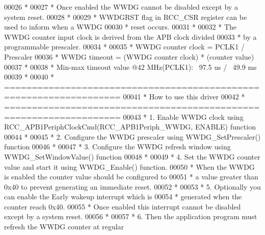 \begin{DoxyCode}
00026 \textcolor{comment}{  *            }
00027 \textcolor{comment}{  *          Once enabled the WWDG cannot be disabled except by a system reset.                       
         }
00028 \textcolor{comment}{  *          }
00029 \textcolor{comment}{  *          WWDGRST flag in RCC\_CSR register can be used to inform when a WWDG}
00030 \textcolor{comment}{  *          reset occurs.}
00031 \textcolor{comment}{  *            }
00032 \textcolor{comment}{  *          The WWDG counter input clock is derived from the APB clock divided }
00033 \textcolor{comment}{  *          by a programmable prescaler.}
00034 \textcolor{comment}{  *              }
00035 \textcolor{comment}{  *          WWDG counter clock = PCLK1 / Prescaler}
00036 \textcolor{comment}{  *          WWDG timeout = (WWDG counter clock) * (counter value)}
00037 \textcolor{comment}{  *                      }
00038 \textcolor{comment}{  *          Min-max timeout value @42 MHz(PCLK1): ~97.5 us / ~49.9 ms}
00039 \textcolor{comment}{  *                            }
00040 \textcolor{comment}{  *          ===================================================================}
00041 \textcolor{comment}{  *                                 How to use this driver}
00042 \textcolor{comment}{  *          =================================================================== }
00043 \textcolor{comment}{  *          1. Enable WWDG clock using RCC\_APB1PeriphClockCmd(RCC\_APB1Periph\_WWDG, ENABLE) function}
00044 \textcolor{comment}{  *            }
00045 \textcolor{comment}{  *          2. Configure the WWDG prescaler using WWDG\_SetPrescaler() function}
00046 \textcolor{comment}{  *                           }
00047 \textcolor{comment}{  *          3. Configure the WWDG refresh window using WWDG\_SetWindowValue() function}
00048 \textcolor{comment}{  *            }
00049 \textcolor{comment}{  *          4. Set the WWDG counter value and start it using WWDG\_Enable() function.}
00050 \textcolor{comment}{  *             When the WWDG is enabled the counter value should be configured to }
00051 \textcolor{comment}{  *             a value greater than 0x40 to prevent generating an immediate reset.     }
00052 \textcolor{comment}{  *            }
00053 \textcolor{comment}{  *          5. Optionally you can enable the Early wakeup interrupt which is }
00054 \textcolor{comment}{  *             generated when the counter reach 0x40.}
00055 \textcolor{comment}{  *             Once enabled this interrupt cannot be disabled except by a system reset.}
00056 \textcolor{comment}{  *                 }
00057 \textcolor{comment}{  *          6. Then the application program must refresh the WWDG counter at regular}

\end{DoxyCode}
